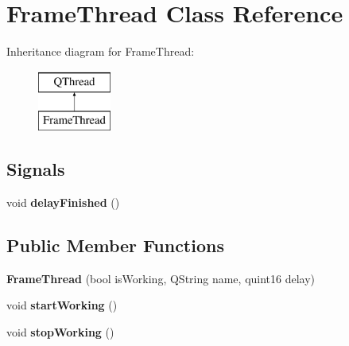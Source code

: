 \hypertarget{class_frame_thread}{}\section{Frame\+Thread Class Reference}
\label{class_frame_thread}
Inheritance diagram for Frame\+Thread\+:\begin{figure}[H]
\begin{center}
\leavevmode
\includegraphics[height=2.000000cm]{class_frame_thread}
\end{center}
\end{figure}
\subsection*{Signals}
\begin{DoxyCompactItemize}
\item 
\mbox{\label{class_frame_thread_a564ac1733b9b0c700140cf1f28fffc70}} 
void {\bfseries delay\+Finished} ()
\end{DoxyCompactItemize}
\subsection*{Public Member Functions}
\begin{DoxyCompactItemize}
\item 
\mbox{\label{class_frame_thread_aa5c077998cc42317db51dee38712e000}} 
{\bfseries Frame\+Thread} (bool is\+Working, Q\+String name, quint16 delay)
\item 
\mbox{\label{class_frame_thread_a213328f70454fffa0524c59b264222e4}} 
void {\bfseries start\+Working} ()
\item 
\mbox{\label{class_frame_thread_afdaa793aa71b374f63bc7bb9f779c126}} 
void {\bfseries stop\+Working} ()
\end{DoxyCompactItemize}
